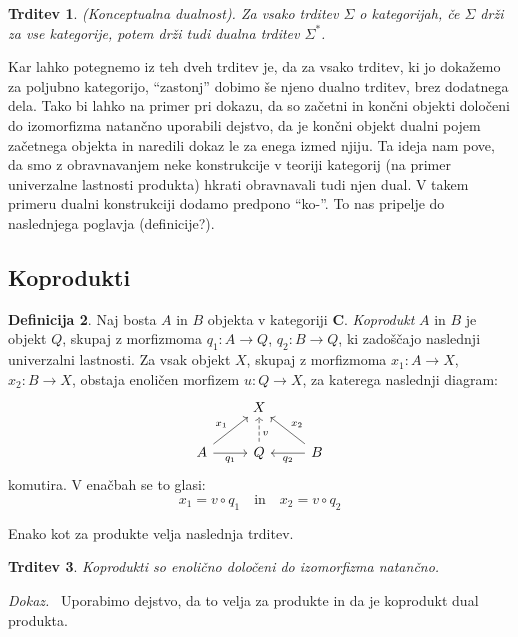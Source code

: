 \documentclass[12pt,a4paper]{book}
\theoremstyle{definition}
\newtheorem{definicija}{Definicija}[chapter]
\theoremstyle{plain}
\newtheorem{trditev}[definicija]{Trditev}
\newenvironment{dokaz}{\emph{Dokaz.}\ }{\hspace{\fill}{$\Box$}}
\theoremstyle{definition}
\theoremstyle{remark}
\newcommand{\cat}[1]{\textbf{#1}}
\begin{document}
\begin{trditev} \emph{(Konceptualna dualnost)}.
Za vsako trditev $\Sigma$ o kategorijah, če $\Sigma$ drži za vse kategorije, potem drži tudi dualna trditev $\Sigma^*$.
\end{trditev}

Kar lahko potegnemo iz teh dveh trditev je, da za vsako trditev, ki jo dokažemo za poljubno kategorijo, "`zastonj"' dobimo še njeno dualno trditev, brez dodatnega dela. Tako bi lahko na primer pri dokazu, da so začetni in končni objekti določeni do izomorfizma natančno uporabili dejstvo, da je končni objekt dualni pojem začetnega objekta in naredili dokaz le za enega izmed njiju.
Ta ideja nam pove, da smo z obravnavanjem neke konstrukcije v teoriji kategorij (na primer univerzalne lastnosti produkta) hkrati obravnavali tudi njen dual. V takem primeru dualni konstrukciji dodamo predpono "`ko-"'. To nas pripelje do naslednjega poglavja (definicije?).

\subsection{Koprodukti}
\begin{definicija}
Naj bosta $A$ in $B$ objekta v kategoriji $\cat{C}$. \emph{Koprodukt} $A$ in $B$ je objekt $Q$, skupaj z morfizmoma $q_1 : A \to Q$, $q_2 : B \to Q$, ki zadoščajo naslednji univerzalni lastnosti. Za vsak objekt $X$, skupaj z morfizmoma $x_1 : A \to X$, $x_2 : B \to X$, obstaja enoličen morfizem $u : Q \to X$, za katerega naslednji diagram:
%
$$\begin{tikzcd}
& X & \\
A \ar[ur, "x_1"] \ar[r, "q_1"'] & Q \ar[u, dashed, pos=0.35, "v"']  & B \ar[l, "q_2"] \ar[ul, "x_2"']
\end{tikzcd}$$
komutira. V enačbah se to glasi:
$$x_1 = v \circ q_1 \quad \text{in} \quad x_2 = v \circ q_2$$
\end{definicija}
Enako kot za produkte velja naslednja trditev.
\begin{trditev}
Koprodukti so enolično določeni do izomorfizma natančno.
\end{trditev}
\begin{dokaz}
Uporabimo dejstvo, da to velja za produkte in da je koprodukt dual produkta.
\end{dokaz}
\end{document}
